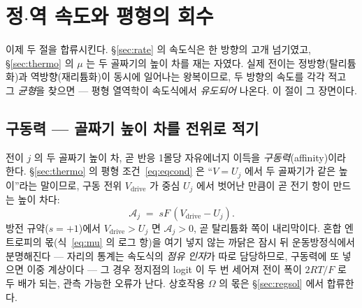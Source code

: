 \documentclass[11pt,a4paper]{article}
\newcommand{\drive}{\mathrm{drive}}
\begin{document}
\section{정$\cdot$역 속도와 평형의 회수}\label{sec:fwdrev}
이제 두 절을 합류시킨다. \S\ref{sec:rate} 의 속도식은 한 방향의 고개 넘기였고, \S\ref{sec:thermo} 의
$\mu$ 는 두 골짜기의 높이 차를 재는 자였다. 실제 전이는 정방향(탈리튬화)과 역방향(재리튬화)이 동시에
일어나는 왕복이므로, 두 방향의 속도를 각각 적고 그 \emph{균형}을 찾으면 — 평형 열역학이 속도식에서
\emph{유도되어} 나온다. 이 절이 그 장면이다.

\subsection{구동력 — 골짜기 높이 차를 전위로 적기}
전이 $j$ 의 두 골짜기 높이 차, 곧 반응 1몰당 자유에너지 이득을 \emph{구동력}(affinity)이라 한다.
\S\ref{sec:thermo} 의 평형 조건~\eqref{eq:eqcond} 은 ``$V=U_j$ 에서 두 골짜기가 같은 높이''라는 말이므로,
구동 전위 $V_\drive$ 가 중심 $U_j$ 에서 벗어난 만큼이 곧 전기 항이 만드는 높이 차다:
\begin{equation}
\mathcal A_j\;=\;sF\,(V_\drive-U_j).
\label{eq:affinity}
\end{equation}
방전 규약($s=+1$)에서 $V_\drive>U_j$ 면 $\mathcal A_j>0$, 곧 탈리튬화 쪽이 내리막이다. 혼합 엔트로피의
몫(식~\eqref{eq:mu} 의 로그 항)을 여기 넣지 않는 까닭은 잠시 뒤 운동방정식에서 분명해진다 — 자리의 통계는
속도식의 \emph{점유 인자}가 따로 담당하므로, 구동력에 또 넣으면 이중 계상이다 — 그 경우
정지점의 logit 이 두 번 세어져 전이 폭이 $2RT/F$ 로 두 배가 되는, 관측 가능한 오류가 난다. 상호작용 $\Omega$ 의
몫은 \S\ref{sec:regsol} 에서 합류한다.
\end{document}
